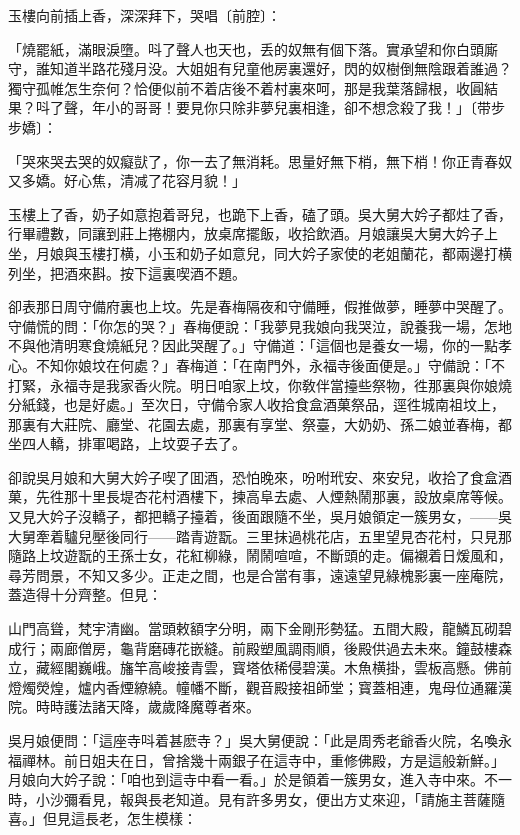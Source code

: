 玉樓向前插上香，深深拜下，哭唱〔前腔〕：

\begin{myquote}
「燒罷紙，滿眼淚墮。呌了聲人也天也，丢的奴無有個下落。實承望和你白頭廝守，誰知道半路花殘月没。大姐姐有兒童他房裏還好，閃的奴樹倒無陰跟着誰過？獨守孤帷怎生奈何？恰便似前不着店後不着村裏來呵，那是我葉落歸根，收圓結果？呌了聲，年小的哥哥！要見你只除非夢兒裏相逢，卻不想念殺了我！」{\marktext\small〔带步步嬌〕}：

「哭來哭去哭的奴癡獃了，你一去了無消耗。思量好無下梢，無下梢！你正青春奴又多嬌。好心焦，清减了花容月貌！」
\end{myquote}

玉樓上了香，奶子如意抱着哥兒，也跪下上香，磕了頭。吳大舅大妗子都炷了香，行畢禮數，同讓到莊上捲棚内，放桌席擺飯，收拾飲酒。月娘讓吳大舅大妗子上坐，月娘與玉樓打横，小玉和奶子如意兒，同大妗子家使的老姐蘭花，都兩邊打横列坐，把酒來斟。按下這裏喫酒不題。

卻表那日周守備府裏也上坟。先是春梅隔夜和守備睡，假推做夢，睡夢中哭醒了。守備慌的問：「你怎的哭？」春梅便說：「我夢見我娘向我哭泣，說養我一場，怎地不與他清明寒食燒紙兒？因此哭醒了。」守備道：「這個也是養女一場，你的一點孝心。不知你娘坟在何處？」春梅道：「在南門外，永福寺後面便是。」守備說：「不打緊，永福寺是我家香火院。明日咱家上坟，你敎伴當擡些祭物，徃那裏與你娘燒分紙錢，也是好處。」至次日，守備令家人收拾食盒酒菓祭品，逕徃城南祖坟上，那裏有大莊院、廳堂、花園去處，那裏有享堂、祭臺，大奶奶、孫二娘並春梅，都坐四人轎，排軍喝路，上坟耍子去了。

卻說吳月娘和大舅大妗子喫了囬酒，恐怕晚來，吩咐玳安、來安兒，收拾了食盒酒菓，先徃那十里長堤杏花村酒樓下，揀高阜去處、人煙熱鬧那裏，設放桌席等候。又見大妗子沒轎子，都把轎子擡着，後面跟隨不坐，吳月娘領定一簇男女，——吳大舅牽着驢兒壓後同行——踏青遊翫。三里抹過桃花店，五里望見杏花村，只見那隨路上坟遊翫的王孫士女，花紅柳綠，鬧鬧喧喧，不斷頭的走。偏襯着日煖風和，尋芳問景，不知又多少。正走之間，也是合當有事，遠遠望見綠槐影裏一座庵院，蓋造得十分齊整。但見：

\begin{myquote}
山門高聳，梵宇清幽。當頭敕額字分明，兩下金剛形勢猛。五間大殿，龍鱗瓦砌碧成行；兩廊僧房，龜背磨磚花嵌縫。前殿塑風調雨順，後殿供過去未來。鐘鼓樓森立，藏經閣巍峨。旛竿高峻接青雲，寳塔依稀侵碧漢。木魚横掛，雲板高懸。佛前燈燭熒煌，爐内香煙繚繞。幢幡不斷，觀音殿接祖師堂；寳蓋相連，鬼母位通羅漢院。時時護法諸天降，歲歲降魔尊者來。
\end{myquote}

吳月娘便問：「這座寺呌着甚麽寺？」吳大舅便說：「此是周秀老爺香火院，名喚永福禪林。前日姐夫在日，曾捨幾十兩銀子在這寺中，重修佛殿，方是這般新鮮。」月娘向大妗子說：「咱也到這寺中看一看。」於是領着一簇男女，進入寺中來。不一時，小沙彌看見，報與長老知道。見有許多男女，便出方丈來迎，「請施主菩薩隨喜。」但見這長老，怎生模樣：

